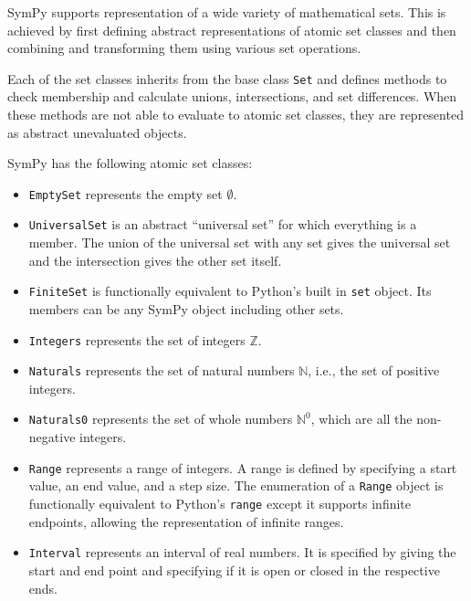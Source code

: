 
SymPy supports representation of a wide variety of mathematical sets. This is
achieved by first defining abstract representations of atomic set classes and
then combining and transforming them using various set operations.

Each of the set classes inherits from the base class \texttt{Set} and defines
methods to check membership and calculate unions, intersections, and set
differences. When these methods are not able to evaluate to atomic set
classes, they are represented as abstract unevaluated objects.

SymPy has the following atomic set classes:

\begin{itemize}

    \item \verb|EmptySet| represents the empty set $\emptyset$.

    \item \verb|UniversalSet| is an abstract ``universal set'' for which
      everything is a member. The union of the universal set with any set
      gives the universal set and the intersection gives the other set itself.

    \item \verb|FiniteSet| is functionally equivalent to Python's built
      in \texttt{set} object. Its members can be any SymPy object including
      other sets.

    \item \verb|Integers| represents the set of integers $\mathbb{Z}$.

    \item \verb|Naturals| represents the set of natural numbers $\mathbb{N}$,
      i.e., the set of positive integers.

    \item \verb|Naturals0| represents the set of whole numbers $\mathbb{N}^0$,
      which are all the non-negative integers.

    \item \verb|Range| represents a range of integers. A range is defined by
      specifying a start value, an end value, and a step size. The enumeration
      of a \texttt{Range} object is functionally equivalent to Python's
      \texttt{range} except it supports infinite endpoints, allowing the
      representation of infinite ranges.

    \item \verb|Interval| represents an interval of real numbers. It is
      specified by giving the start and end point and specifying if it is open
      or closed in the respective ends.


\end{itemize}


